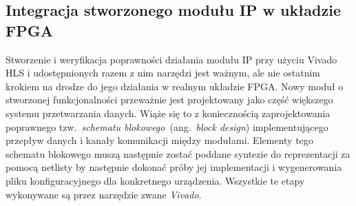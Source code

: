 \subsection{Integracja stworzonego modułu IP w układzie FPGA}
Stworzenie i weryfikacja poprawności działania modułu IP przy użyciu Vivado HLS i udostępnionych razem z nim narzędzi jest ważnym, ale nie ostatnim krokiem na drodze do jego działania w realnym układzie FPGA. Nowy moduł o stworzonej funkcjonalności przeważnie jest projektowany jako część większego systemu przetwarzania danych. Wiąże się to z koniecznością zaprojektowania poprawnego tzw.~\textit{schematu blokowego}~(ang.~\textit{block design}) implementującego przepływ danych i kanały komunikacji między modułami. Elementy tego schematu blokowego muszą następnie zostać poddane syntezie do reprezentacji za pomocą netlisty by następnie dokonać próby jej implementacji i wygenerowania pliku konfiguracyjnego dla konkretnego urządzenia. Wszystkie te etapy wykonywane są przez narzędzie zwane \textit{Vivado}.
